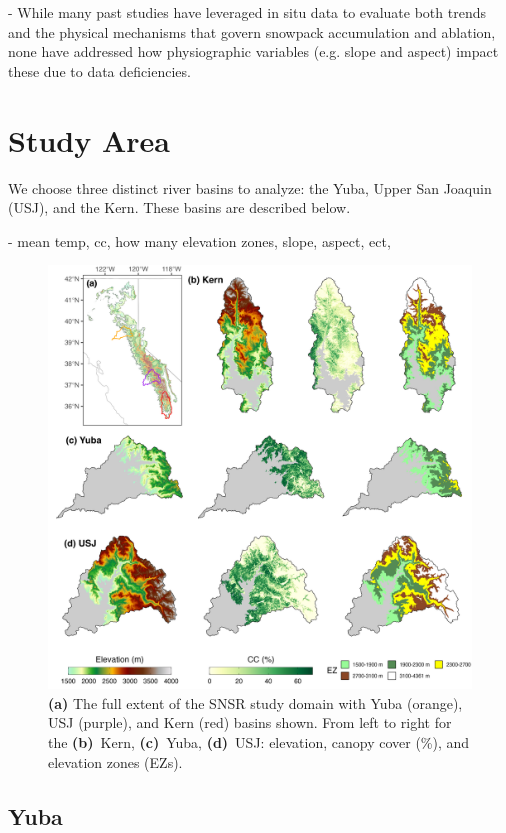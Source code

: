-	While many past studies have leveraged in situ data to evaluate both trends and the physical mechanisms that govern snowpack accumulation and ablation, none have addressed how physiographic variables (e.g. slope and aspect) impact these due to data deficiencies. \

 

\hypertarget{ch2-sa}{\section{Study Area}\label{ch2-sa}}

We choose three distinct river basins to analyze: the Yuba, Upper San Joaquin (USJ), and the Kern. These basins are described below.

- mean temp, cc, how many elevation zones, slope, aspect, ect,

\begin{figure}[t]
\centering
\includegraphics[width=14cm]{figures/ch2_figs/kuy_study_area_v2.png}
\caption{\textbf{(a)} The full extent of the SNSR study domain with Yuba (orange), USJ (purple), and Kern (red) basins shown. From left to right for the \textbf{(b)}~Kern, \textbf{(c)}~Yuba, \textbf{(d)}~USJ: elevation, canopy cover (\%), and elevation zones (EZs).}
\label{kuy_study_area}
\end{figure}
\hypertarget{ch2-sa-1}{\subsection{Yuba}\label{ch2-sa-1}}


